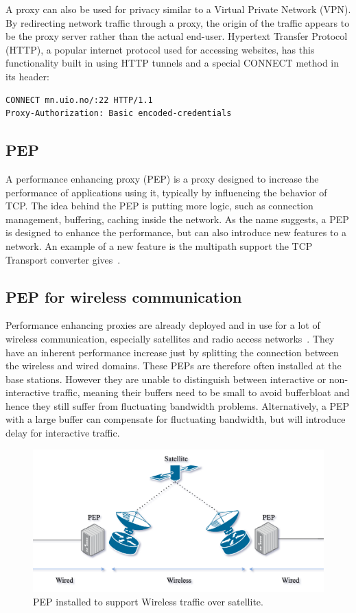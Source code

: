 \documentclass[a4paper,english, 12pt]{report}
\begin{document}
A proxy can also be used for privacy similar to a Virtual Private Network (VPN). By redirecting network traffic through a proxy, the origin of the traffic appears to be the proxy server rather than the actual end-user. Hypertext Transfer Protocol (HTTP), a popular internet protocol used for accessing websites, has this functionality built in using HTTP tunnels and a special CONNECT method in its header:\\

\begin{verbatim}
CONNECT mn.uio.no/:22 HTTP/1.1
Proxy-Authorization: Basic encoded-credentials
\end{verbatim}

\subsection{PEP}
A performance enhancing proxy (PEP) is a proxy designed to increase the performance of applications using it, typically by influencing the behavior of TCP. The idea behind the PEP is putting more logic, such as connection management, buffering, caching inside the network. As the name suggests, a PEP is designed to enhance the performance, but can also introduce new features to a network. An example of a new feature is the multipath support the TCP Transport converter gives~\cite{rfc8803}.

\subsection{PEP for wireless communication}
Performance enhancing proxies are already deployed and in use for a lot of wireless communication, especially satellites and radio access networks~\cite{tcp_mmwave_proxy}. They have an inherent performance increase just by splitting the connection between the wireless and wired domains. These PEPs are therefore often installed at the base stations. However they are unable to distinguish between interactive or non-interactive traffic, meaning their buffers need to be small to avoid bufferbloat and hence they still suffer from fluctuating bandwidth problems. Alternatively, a PEP with a large buffer can compensate for fluctuating bandwidth, but will introduce delay for interactive traffic.

\begin{figure}[h] %
	\centering
	\includegraphics[scale=0.50]{../diagrams/drawio/pep_satellite.png}
  	\caption{PEP installed to support Wireless traffic over satellite.}
  	\label{fig:blockage}
\end{figure}
\end{document}
